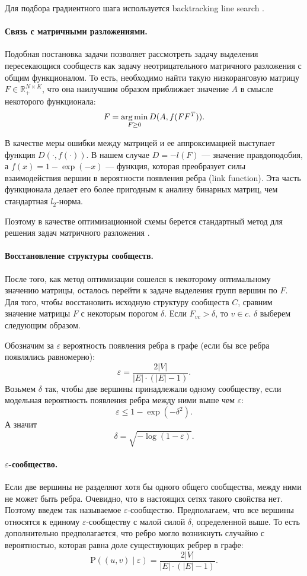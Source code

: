 \documentclass{ITaSconf}
\newcommand{\argmin}{\mathop{\rm arg\,min}\limits}
\def\PP{\mathrm{P}}
\begin{document}
Для подбора градиентного шага используется backtracking line search \cite{boyd2004convex}.

\paragraph{Связь с матричными разложениями.}
Подобная постановка задачи позволяет рассмотреть задачу выделения пересекающися сообществ как задачу неотрицательного матричного разложения с общим функционалом.
То есть, необходимо найти такую низкоранговую матрицу $F\in \mathbb{R}_{+}^{N \times K}$, что она наилучшим образом приближает значение $A$ в смысле некоторого функционала:
$$ F = \argmin_{F\ge 0} D(A, f(F F^T)). $$

В качестве меры ошибки между матрицей и ее аппроксимацией выступает функция $D(\cdot, f(\cdot))$. В нашем случае
$D = -l(F)$ --- значение правдоподобия, а $f(x) = 1 - \exp(-x)$ --- функция, которая преобразует силы взаимодействия вершин в вероятности появления ребра (link function). Эта часть функционала делает его более пригодным к анализу бинарных матриц, чем стандартная $l_2$-норма.

Поэтому в качестве оптимизационной схемы берется стандартный метод для решения задач матричного разложения \cite{lin2007projected}.

\paragraph{Восстановление структуры сообществ.}
После того, как метод оптимизации сошелся к некоторому оптимальному значению матрицы, осталось перейти к задаче выделения групп вершин по $F$.
Для того, чтобы восстановить исходную структуру сообществ $C$, сравним значение матрицы $F$ с некоторым порогом $\delta$. Если $F_{vc} > \delta$, то $v \in c$. $\delta$ выберем следующим образом.

Обозначим за $\varepsilon$ вероятность появления ребра в графе (если бы все ребра появлялись равномерно): 
$$\varepsilon = \dfrac{2|V|}{|E|\cdot (|E|-1)}.$$ 
Возьмем $\delta$ так, чтобы две вершины принадлежали одному сообществу, если модельная вероятность появления ребра между ними выше чем $\varepsilon$:
$$\varepsilon \le 1-\exp(-\delta^2).$$
А значит
$$\delta = \sqrt{-\log(1-\varepsilon)}. $$

\paragraph{ $\varepsilon$-сообщество.} 
Если две вершины не разделяют хотя бы одного общего сообщества, между ними не может быть ребра.  
Очевидно, что в настоящих сетях такого свойства нет.
Поэтому введем так называемое $\varepsilon$-сообщество.
Предполагаем, что все вершины относятся к единому $\varepsilon$-сообществу с малой силой $\delta$, определенной выше.
То есть дополнительно предполагается, что ребро могло возникнуть случайно с вероятностью, которая равна доле существующих ребрер в графе:
$$ \PP((u,v)\mid \varepsilon) = \dfrac{2|V|}{|E| \cdot \left( |E| - 1 \right)}.$$
\end{document}
